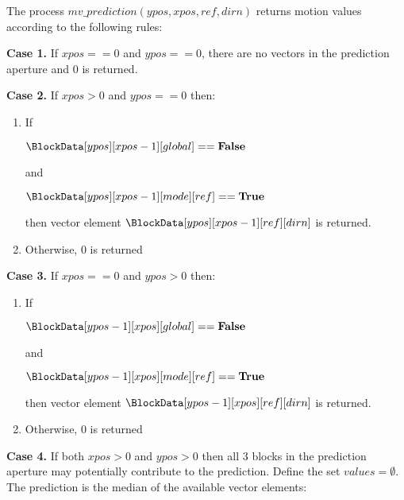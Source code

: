 The process $mv\_prediction(ypos, xpos, ref, dirn)$ returns motion values according to
the following rules:

{\bf Case 1.}  If $xpos==0$ and $ypos==0$, there are no vectors in the prediction aperture and
 $0$ is returned.

{\bf Case 2.} If $xpos>0$ and $ypos==0$ then:
\begin{enumerate}
   \item If 

$\BlockData[ypos][xpos-1][global]==\false$ 

and 

$\BlockData[ypos][xpos-1][mode][ref]==\true$ 

then vector element $\BlockData[ypos][xpos-1][ref][dirn]$ is returned.

   \item Otherwise, $0$ is returned
\end{enumerate}

{\bf Case 3.} If $xpos==0$ and $ypos>0$ then:
\begin{enumerate}
   \item If 

$\BlockData[ypos-1][xpos][global]==\false$ 

and 

$\BlockData[ypos-1][xpos][mode][ref]==\true$

then vector element $\BlockData[ypos-1][xpos][ref][dirn]$ is returned.

   \item Otherwise, $0$ is returned
\end{enumerate}

{\bf Case 4.} If both $xpos>0$ and $ypos>0$ then all 3 blocks in the prediction aperture may potentially
contribute to the prediction. Define the set $values=\emptyset$. The prediction is the 
median of the available vector elements:

\begin{pseudo*}
    \bsIF{\BlockData[ypos][xpos-1][global]==\false}
        \bsIF{\BlockData[ypos][xpos-1][mode][ref]==\true}
        \bsEND
    \bsEND
    \bsIF{\BlockData[ypos-1][xpos][global]==\false}
        \bsIF{\BlockData[ypos-1][xpos][mode][ref]==\true}
        \bsEND
    \bsEND
    \bsIF{\BlockData[ypos-1][xpos-1][global]==\false}
        \bsIF{\BlockData[ypos-1][xpos-1][mode][ref]==\true}
        \bsEND
    \bsEND

\bsEND
\end{pseudo*}

